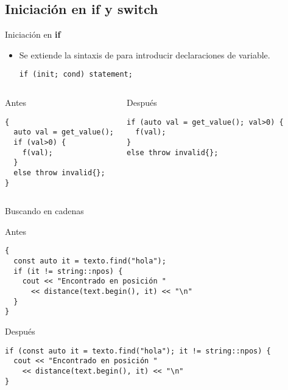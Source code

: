 \subsection{Iniciación en {\bf if} y {\bf switch}}

\begin{frame}[t,fragile]{Iniciación en \textbf{if}}
\begin{itemize}
  \item Se extiende la sintaxis de  para introducir declaraciones de variable.
\begin{lstlisting}
if (init; cond) statement;
\end{lstlisting}
\end{itemize}

\vfill\pause
\begin{columns}[T]

\begin{block}{Antes}
\begin{lstlisting}
{
  auto val = get_value();
  if (val>0) {
    f(val);
  }
  else throw invalid{}; 
}
\end{lstlisting}
\end{block}

\pause
{}
\begin{block}{Después}
\begin{lstlisting}
if (auto val = get_value(); val>0) {
  f(val);
}
else throw invalid{};
\end{lstlisting}
\end{block}

\end{columns}
\end{frame}


\begin{frame}[t,fragile]{Buscando en cadenas}
\begin{block}{Antes}
\begin{lstlisting}
{
  const auto it = texto.find("hola");
  if (it != string::npos) {
    cout << "Encontrado en posición "
      << distance(text.begin(), it) << "\n"
  }
}
\end{lstlisting}
\end{block}

\pause
\begin{block}{Después}
\begin{lstlisting}
if (const auto it = texto.find("hola"); it != string::npos) {
  cout << "Encontrado en posición "
    << distance(text.begin(), it) << "\n"
}
\end{lstlisting}
\end{block}
\end{frame}

